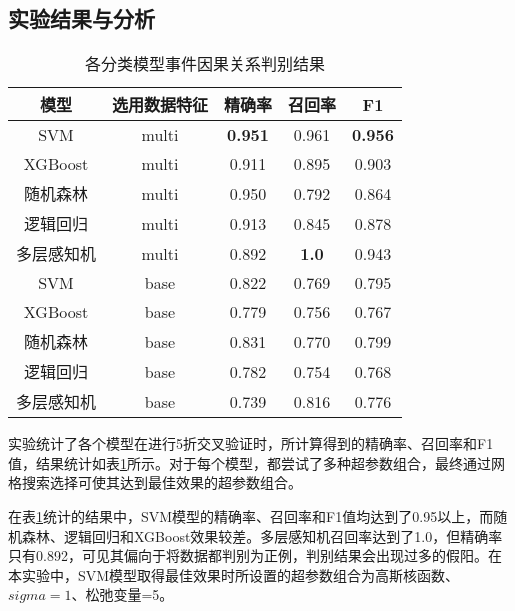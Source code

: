 \subsection{实验结果与分析}
\begin{table}[htbp]
    \caption{各分类模型事件因果关系判别结果}
    \centering
    \label{cause-relation-result}
    \begin{tabular}{ccccc}
    \toprule[2pt]
    模型      & 选用数据特征              & 精确率            & 召回率                           & F1             \\ \midrule[2pt]
    SVM     & multi               & \textbf{0.951} & 0.961                         & \textbf{0.956} \\
    XGBoost & multi               & 0.911          & 0.895                         & 0.903          \\
    随机森林    & multi               & 0.950          & 0.792                         & 0.864          \\
    逻辑回归    & multi               & 0.913          & 0.845                         & 0.878          \\
    多层感知机   & multi               & 0.892          & \textbf{1.0}                  & 0.943          \\ \midrule[1pt]
    SVM     & base & 0.822          & 0.769                         & 0.795          \\
    XGBoost & base & 0.779          & 0.756                         & 0.767          \\
    随机森林    & base & 0.831          & 0.770                         & 0.799          \\
    逻辑回归    & base & 0.782          & 0.754                         & 0.768          \\
    多层感知机   & base & 0.739          & 0.816  & 0.776          \\ \bottomrule[2pt]
    \end{tabular}
\end{table}
实验统计了各个模型在进行5折交叉验证时，所计算得到的精确率、召回率和F1值，结果统计如表\ref{cause-relation-result}所示。对于每个模型，都尝试了多种超参数组合，最终通过网格搜索选择可使其达到最佳效果的超参数组合。

在表\ref{cause-relation-result}统计的结果中，SVM模型的精确率、召回率和F1值均达到了0.95以上，而随机森林、逻辑回归和XGBoost效果较差。多层感知机召回率达到了1.0，但精确率只有0.892，可见其偏向于将数据都判别为正例，判别结果会出现过多的假阳。在本实验中，SVM模型取得最佳效果时所设置的超参数组合为高斯核函数、$sigma=1$、松弛变量=5。

